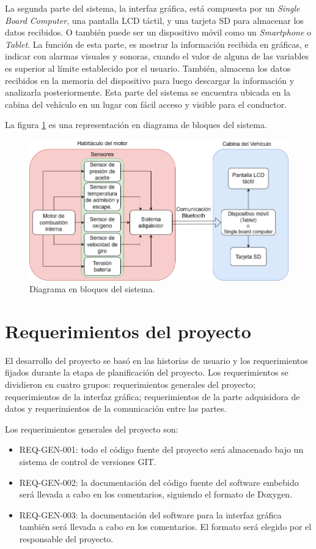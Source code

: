 La segunda parte del sistema, la interfaz gráfica, está compuesta por un \textit{Single Board Computer}, una pantalla LCD táctil, y una tarjeta SD para almacenar los datos recibidos. O también puede ser un dispositivo móvil como un \textit{Smartphone} o \textit{Tablet}. La función de esta parte, es mostrar la información recibida en gráficas, e indicar con alarmas visuales y sonoras, cuando el valor de alguna de las variables es superior al límite establecido por el usuario. También, almacena los datos recibidos en la memoria del dispositivo para luego descargar la información y analizarla posteriormente. Esta parte del sistema se encuentra ubicada en la cabina del vehículo en un lugar con fácil acceso y visible para el conductor.

La figura \ref{fig:diagrama-de-bloques} es una representación en diagrama de bloques del sistema.

\begin{figure}[htpb]
\centering
\includegraphics[width=.9\textwidth]{./Figures/diagrama-proyecto.png}
\caption{Diagrama en bloques del sistema.}
\label{fig:diagrama-de-bloques}
\end{figure}

\section{Requerimientos del proyecto}

El desarrollo del proyecto se basó en las historias de usuario y los requerimientos fijados durante la etapa de planificación del proyecto. Los requerimientos se dividieron en cuatro grupos: requerimientos generales del proyecto; requerimientos de la interfaz gráfica; requerimientos de la parte adquisidora de datos y requerimientos de la comunicación entre las partes.

Los requerimientos generales del proyecto son:
\begin{itemize}
\item REQ-GEN-001: todo el código fuente del proyecto será almacenado bajo un sistema de control de versiones GIT.
\item REQ-GEN-002: la documentación del código fuente del software embebido será llevada a cabo en los comentarios, siguiendo el formato de Doxygen.
\item REQ-GEN-003: la documentación del software para la interfaz gráfica también será llevada a cabo en los comentarios. El formato será elegido por el responsable del proyecto.
\end{itemize}

